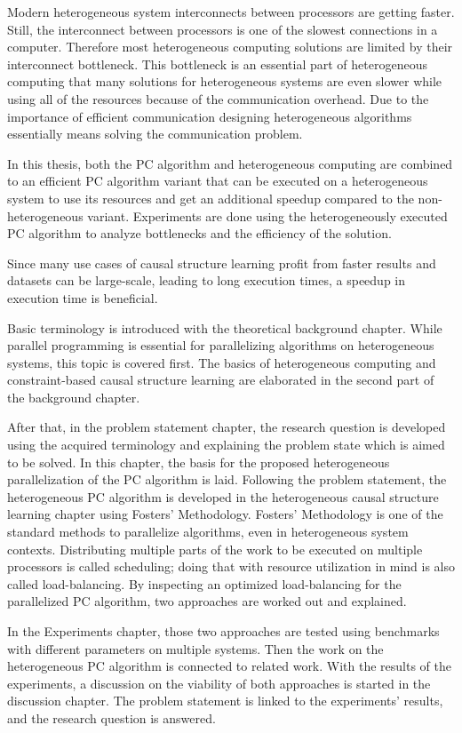 Modern heterogeneous system interconnects between processors are getting faster. Still, the interconnect between processors is one of the slowest connections in a computer. Therefore most heterogeneous computing solutions are limited by their interconnect bottleneck. This bottleneck is an essential part of heterogeneous computing that many solutions for heterogeneous systems are even slower while using all of the resources because of the communication overhead. Due to the importance of efficient communication designing heterogeneous algorithms essentially means solving the communication problem.

In this thesis, both the PC algorithm and heterogeneous computing are combined to an efficient PC algorithm variant that can be executed on a heterogeneous system to use its resources and get an additional speedup compared to the non-heterogeneous variant. Experiments are done using the heterogeneously executed PC algorithm to analyze bottlenecks and the efficiency of the solution.

Since many use cases of causal structure learning profit from faster results and datasets can be large-scale, leading to long execution times, a speedup in execution time is beneficial.

Basic terminology is introduced with the theoretical background chapter. While parallel programming is essential for parallelizing algorithms on heterogeneous systems, this topic is covered first. The basics of heterogeneous computing and constraint-based causal structure learning are elaborated in the second part of the background chapter.

After that, in the problem statement chapter, the research question is developed using the acquired terminology and explaining the problem state which is aimed to be solved. In this chapter, the basis for the proposed heterogeneous parallelization of the PC algorithm is laid. Following the problem statement, the heterogeneous PC algorithm is developed in the heterogeneous causal structure learning chapter using Fosters' Methodology. Fosters' Methodology is one of the standard methods to parallelize algorithms, even in heterogeneous system contexts. Distributing multiple parts of the work to be executed on multiple processors is called scheduling; doing that with resource utilization in mind is also called load-balancing. By inspecting an optimized load-balancing for the parallelized PC algorithm, two approaches are worked out and explained.

In the Experiments chapter, those two approaches are tested using benchmarks with different parameters on multiple systems. Then the work on the heterogeneous PC algorithm is connected to related work. With the results of the experiments, a discussion on the viability of both approaches is started in the discussion chapter. The problem statement is linked to the experiments' results, and the research question is answered.

